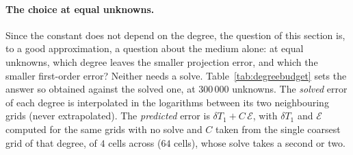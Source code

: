 \documentclass[11pt,a4paper]{article}
\newcommand{\cE}{\mathcal{E}}
\begin{document}
\paragraph{The choice at equal unknowns.} Since the constant does not depend on the degree, the question
of this section is, to a good approximation, a question about the medium alone: at equal unknowns, which
degree leaves the smaller projection error, and which the smaller first-order error? Neither needs a
solve. Table~\ref{tab:degreebudget} sets the answer so obtained against the solved one, at $300\,000$
unknowns. The \emph{solved} error of each degree is interpolated in the logarithms between its two
neighbouring grids (never extrapolated). The \emph{predicted} error is $\delta T_1+C\,\cE$, with
$\delta T_1$ and $\cE$ computed for the same grids with no solve and $C$ taken from the single coarsest
grid of that degree, of $4$ cells across ($64$ cells), whose solve takes a second or two.
\end{document}
